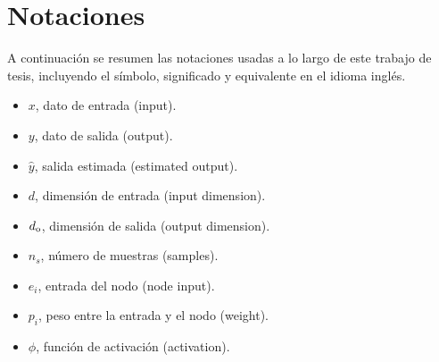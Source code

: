 \chapter{Notaciones}

A continuación se resumen las notaciones usadas a lo largo de este trabajo de tesis, incluyendo el símbolo,  significado y equivalente en el idioma inglés.

\begin{itemize}
    \item $x$, dato de entrada (input).
    \item $y$, dato de salida (output).
    \item $\hat{y}$, salida estimada (estimated output).
    \item $d$, dimensión de entrada (input dimension).
    \item $d_{\rm o}$, dimensión de salida (output dimension).
    \item $n_s$, número de muestras (samples).
    \item $e_i$, entrada del nodo (node input).
    \item $p_i$, peso entre la entrada y el nodo (weight).
    \item $\phi$, función de activación (activation).
\end{itemize}

